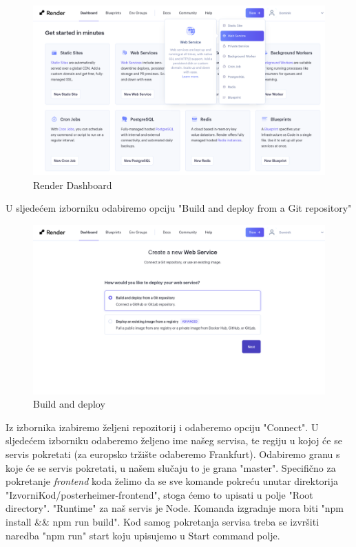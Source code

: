 			\begin{figure} [H]
				\includegraphics[width=\linewidth]{Slike/Render-Dashboard}
				\caption{Render Dashboard}
			\end{figure}
			
			\newpage
			U sljedećem izborniku odabiremo opciju "Build and deploy from a Git repository"
			
			\begin{figure} [H]
				\includegraphics[width=\linewidth]{Slike/Build-and-deploy}
				\caption{Build and deploy}
			\end{figure}
			
			Iz izbornika izabiremo željeni repozitorij i odaberemo opciju "Connect". U sljedećem izborniku odaberemo željeno ime našeg servisa, te regiju u kojoj će se servis pokretati (za europsko tržište odaberemo Frankfurt). Odabiremo granu s koje će se servis pokretati, u našem slučaju to je grana "master". Specifično za pokretanje \textit{frontend} koda želimo da se sve komande pokreću unutar direktorija "IzvorniKod/posterheimer-frontend", stoga ćemo to upisati u polje "Root directory". "Runtime" za naš servis je Node. Komanda izgradnje mora biti "npm install \&\& npm run build". Kod samog pokretanja servisa treba se izvršiti naredba "npm run" start koju upisujemo u Start command polje.
			
